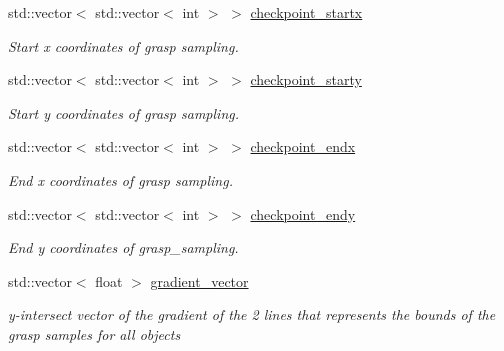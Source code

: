 \begin{DoxyCompactItemize}
\mbox{\label{classTwoFinger_aecf45fe9ca431e9cb3e2844686b112f3}} 
std\+::vector$<$ std\+::vector$<$ int $>$ $>$ \hyperlink{classTwoFinger_aecf45fe9ca431e9cb3e2844686b112f3}{checkpoint\+\_\+startx}
\begin{DoxyCompactList}\small\item\em Start x coordinates of grasp sampling. \end{DoxyCompactList}\item 
\mbox{\label{classTwoFinger_afb2bad19c2dfabb035af09e5c96fabf3}} 
std\+::vector$<$ std\+::vector$<$ int $>$ $>$ \hyperlink{classTwoFinger_afb2bad19c2dfabb035af09e5c96fabf3}{checkpoint\+\_\+starty}
\begin{DoxyCompactList}\small\item\em Start y coordinates of grasp sampling. \end{DoxyCompactList}\item 
\mbox{\label{classTwoFinger_afaf5faa229c2a95f0233a180643a905d}} 
std\+::vector$<$ std\+::vector$<$ int $>$ $>$ \hyperlink{classTwoFinger_afaf5faa229c2a95f0233a180643a905d}{checkpoint\+\_\+endx}
\begin{DoxyCompactList}\small\item\em End x coordinates of grasp sampling. \end{DoxyCompactList}\item 
\mbox{\label{classTwoFinger_aa4b0f0761ef17a83edf7548c57ddbe06}} 
std\+::vector$<$ std\+::vector$<$ int $>$ $>$ \hyperlink{classTwoFinger_aa4b0f0761ef17a83edf7548c57ddbe06}{checkpoint\+\_\+endy}
\begin{DoxyCompactList}\small\item\em End y coordinates of grasp\+\_\+sampling. \end{DoxyCompactList}\item 
\mbox{\label{classTwoFinger_a703a859bf7ac397ef7a00f85d540d873}} 
std\+::vector$<$ float $>$ \hyperlink{classTwoFinger_a703a859bf7ac397ef7a00f85d540d873}{gradient\+\_\+vector}
\begin{DoxyCompactList}\small\item\em y-\/intersect vector of the gradient of the 2 lines that represents the bounds of the grasp samples for all objects \end{DoxyCompactList}\item 

\end{DoxyCompactItemize}
